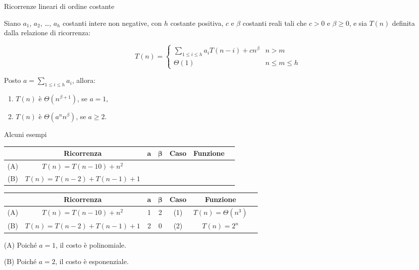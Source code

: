 \begin{frame}{Ricorrenze lineari di ordine costante}

\begin{myboxtitle}[Teorema]
Siano $a_1$, $a_2$, \ldots, $a_h$ costanti intere non negative, con $h$
costante positiva, $c$ e $\beta$ costanti reali tali che $c > 0$ e $\beta \ge
0$, e sia $T(n)$ definita dalla relazione di ricorrenza:

\[
T(n) = \begin{cases}
\sum_{1 \le i \le h} a_iT(n - i) + cn^\beta & n > m \\
\Theta(1) & n \le m \le h
\end{cases}
\]

Posto $a = \displaystyle\sum_{1 \le i \le h}a_i$, allora:
\begin{enumerate}
\item $T(n)$ è $\Theta(n^{\beta+1})$, se $a = 1$,
\item $T(n)$ è $\Theta(a^nn^\beta)$, se $a \ge 2$.
\end{enumerate}

\end{myboxtitle}

\end{frame}


\begin{frame}[shrink=6]{Alcuni esempi}

\bgroup
\def\arraystretch{1.1}

\begin{overprint}


\begin{tabular}{|c|c|c|c|c|c|c|}
\hline
&\textbf{Ricorrenza} & $\mathbf{a}$ & $\mathbf{\beta}$ & \textbf{Caso} & \textbf{Funzione} \\
\hline
(A) & $T(n) = T(n-10)+n^2$ &  &  &  &  \\
\hline
(B) & $T(n) = T(n-2)+T(n-1)+1$ &  &  & &  \\
\hline
\end{tabular}


\begin{tabular}{|c|c|c|c|c|c|c|}
\hline
&\textbf{Ricorrenza} & $\mathbf{a}$ & $\mathbf{\beta}$ & \textbf{Caso} & \textbf{Funzione} \\
\hline
(A) & $T(n) = T(n-10)+n^2$ & 1 & 2 & (1) & $T(n) = \Theta(n^3)$ \\
\hline
(B) & $T(n) = T(n-2)+T(n-1)+1$ & 2 & 0 & (2) & $T(n) = 2^n$ \\
\hline
\end{tabular}

\end{overprint}

\egroup

\begin{mybox}
\BIL
\item[(A)] Poiché $a=1$, il costo è polinomiale.
\item[(B)] Poiché $a=2$, il costo è esponenziale.
\EIL
\end{mybox}

\end{frame}

